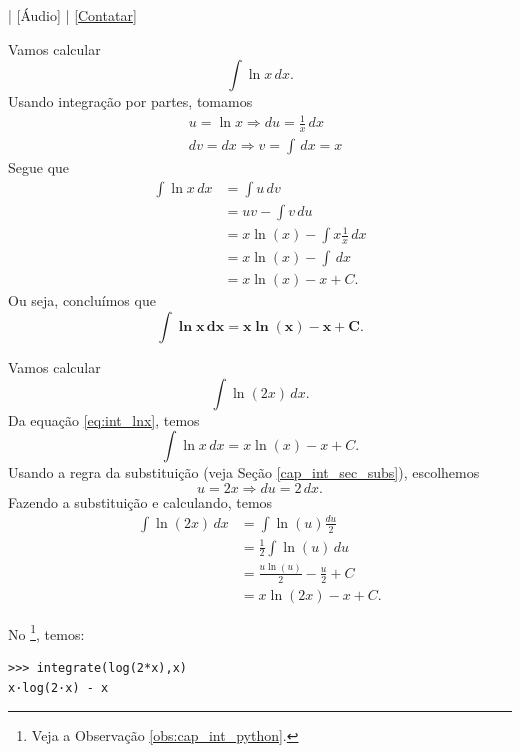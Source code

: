 \begin{flushright}
  [Vídeo] | [Áudio] | \href{https://phkonzen.github.io/notas/contato.html}{[Contatar]}
\end{flushright}

Vamos calcular
\begin{equation}
  \int \ln x\,dx.
\end{equation}
Usando integração por partes, tomamos
\begin{align}
  &u = \ln x \Rightarrow du = \frac{1}{x}\,dx \\
  &dv = dx \Rightarrow v = \int\,dx = x
\end{align}
Segue que
\begin{align}
  \int \ln x \,dx &= \int u\,dv \\
                  &= uv - \int v\,du \\
                  &= x\ln(x) - \int x\frac{1}{x}\,dx \\
                  &= x\ln(x) - \int\,dx \\
                  &= x\ln(x) - x + C.
\end{align}
Ou seja, concluímos que
\begin{equation}\label{eq:int_lnx}
  \pmb{\int \ln x \,dx = x\ln(x) - x + C}.
\end{equation}

\begin{ex}
  Vamos calcular
  \begin{equation}
    \int \ln(2x)\,dx.
  \end{equation}
  Da equação \ref{eq:int_lnx}, temos
  \begin{equation}
    \int \ln x\,dx = x\ln(x) - x + C.
  \end{equation}
  Usando a regra da substituição (veja Seção \ref{cap_int_sec_subs}), escolhemos
  \begin{equation}
    u = 2x \Rightarrow du = 2\,dx.
  \end{equation}
  Fazendo a substituição e calculando, temos
  \begin{align}
    \int \ln(2x)\,dx &= \int \ln(u)\frac{du}{2} \\
                     &= \frac{1}{2}\int \ln(u)\,du \\
                     &= \frac{u\ln(u)}{2} - \frac{u}{2} + C \\
                     &= x\ln(2x) - x + C.
  \end{align}

  \ifispython
  No \sympy\footnote{Veja a Observação \ref{obs:cap_int_python}.}, temos:
\begin{verbatim}
>>> integrate(log(2*x),x)
x·log(2·x) - x
\end{verbatim}
  \fi
\end{ex}

